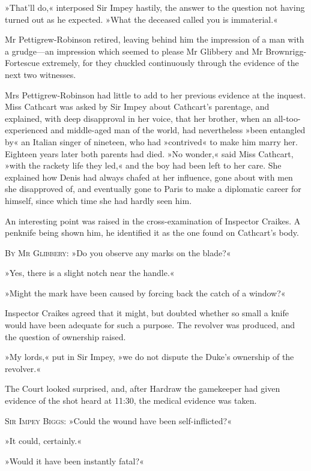 »That'll do,« interposed Sir Impey hastily, the answer to the question not having turned out as he expected. »What the deceased called you is immaterial.«

Mr Pettigrew-Robinson retired, leaving behind him the impression of a man with a grudge\allowbreak---\allowbreak an impression which seemed to please Mr Glibbery and Mr Brownrigg-Fortescue extremely, for they chuckled continuously through the evidence of the next two witnesses.

Mrs Pettigrew-Robinson had little to add to her previous evidence at the inquest. Miss Cathcart was asked by Sir Impey about Cathcart's parentage, and explained, with deep disapproval in her voice, that her brother, when an all-too-experienced and middle-aged man of the world, had nevertheless »been entangled by« an Italian singer of nineteen, who had »contrived« to make him marry her. Eighteen years later both parents had died. »No wonder,« said Miss Cathcart, »with the rackety life they led,« and the boy had been left to her care. She explained how Denis had always chafed at her influence, gone about with men she disapproved of, and eventually gone to Paris to make a diplomatic career for himself, since which time she had hardly seen him.

An interesting point was raised in the cross-examination of Inspector Craikes. A penknife being shown him, he identified it as the one found on Cathcart's body.

\textsc{By Mr Glibbery}: »Do you observe any marks on the blade?«

»Yes, there is a slight notch near the handle.«

»Might the mark have been caused by forcing back the catch of a window?«

Inspector Craikes agreed that it might, but doubted whether so small a knife would have been adequate for such a purpose. The revolver was produced, and the question of ownership raised.

»My lords,« put in Sir Impey, »we do not dispute the Duke's ownership of the revolver.«

The Court looked surprised, and, after Hardraw the gamekeeper had given evidence of the shot heard at 11:30, the medical evidence was taken.

\textsc{Sir Impey Biggs}: »Could the wound have been self-inflicted?«

»It could, certainly.«

»Would it have been instantly fatal?«

